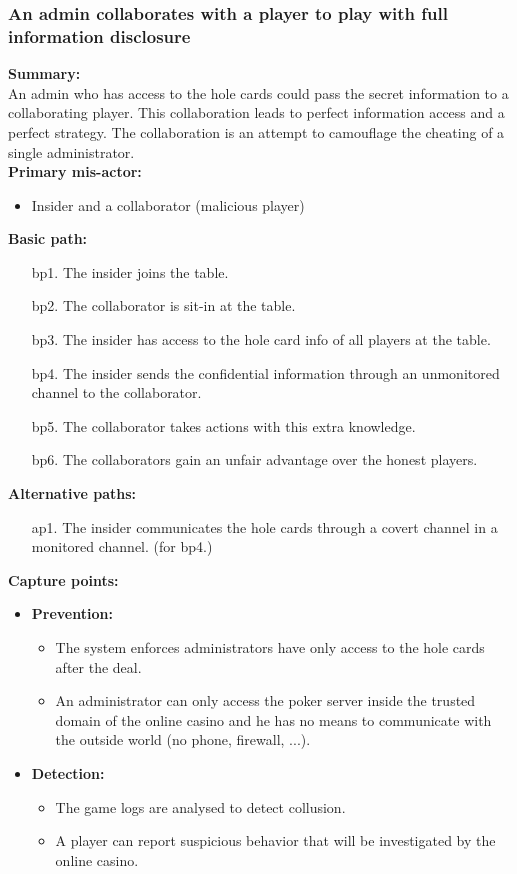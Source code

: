 \documentclass[a4paper,11pt]{report}
\begin{document}
\subsubsection{An admin collaborates with a player to play with full information disclosure}
\textbf{Summary:} \\
An admin who has access to the hole cards could pass the secret information to a collaborating player. This collaboration leads to perfect information access and a perfect strategy. The collaboration is an attempt to camouflage the cheating of a single administrator. \\
\textbf{Primary mis-actor:}
\begin{itemize}
\item Insider and a collaborator (malicious player)
\end{itemize}
\textbf{Basic path:}
\begin{enumerate}
\item[bp1.] The insider joins the table.
\item[bp2.] The collaborator is sit-in at the table.
\item[bp3.] The insider has access to the hole card info of all players at the table.
\item[bp4.] The insider sends the confidential information through an unmonitored channel to the collaborator.
\item[bp5.] The collaborator takes actions with this extra knowledge.
\item[bp6.] The collaborators gain an unfair advantage over the honest players.
\end{enumerate}
\textbf{Alternative paths:}
\begin{itemize}
\item[ap1.] The insider communicates the hole cards through a covert channel in a monitored channel. (for bp4.)
\end{itemize}
\textbf{Capture points:}
\begin{itemize}
\item \textbf{Prevention:}
\begin{itemize}
\item The system enforces administrators have only access to the hole cards after the deal.
\item An administrator can only access the poker server inside the trusted domain of the online casino and he has no means to communicate with the outside world (no phone, firewall, ...).
\end{itemize}
\item \textbf{Detection:}
\begin{itemize}
\item The game logs are analysed to detect collusion.
\item A player can report suspicious behavior that will be investigated by the online casino.
\end{itemize}
\end{itemize}
\end{document}
